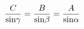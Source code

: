 \documentclass[preview]{standalone}
\begin{document}
\begin{align*}
{ C \over {\rm sin} \gamma } = { B \over {\rm sin} \beta } = { A \over {\rm sin} \alpha }
\end{align*}
\end{document}
